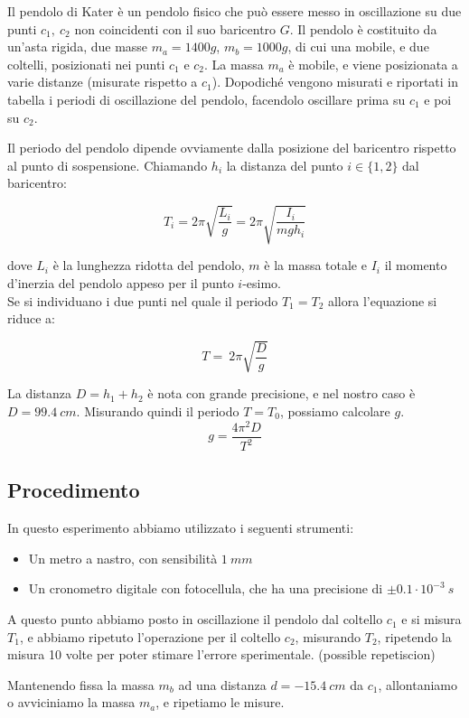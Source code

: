 Il pendolo di Kater è un pendolo fisico che può essere messo in oscillazione su due punti $c_1,\ c_2$ non coincidenti con il suo baricentro $G$. Il pendolo è costituito da un'asta rigida, due masse $m_a = 1400g$, $m_b=1000g$, di cui una mobile, e due coltelli, posizionati nei punti $c_1$ e $c_2$. La massa $m_a$ è mobile, e viene posizionata a varie distanze (misurate rispetto a $c_1$). Dopodiché vengono misurati e riportati in tabella i periodi di oscillazione del pendolo, facendolo oscillare prima su $c_1$ e poi su $c_2$.

Il periodo del pendolo dipende ovviamente dalla posizione del baricentro rispetto al punto di sospensione. Chiamando $h_i$ la distanza del punto $i\in\{1,2\}$ dal baricentro:

$$ T_i = 2 \pi \sqrt{\frac{L_i}{g}} = 2 \pi \sqrt{\frac{I_i}{m gh_i}}$$

dove $L_i$ è la lunghezza ridotta del pendolo, $m$ è la massa totale e $I_i$ il momento d'inerzia del pendolo appeso per il punto $i$-esimo.
\\
Se si individuano i due punti nel quale il periodo $T_1 = T_2$ allora l'equazione si riduce a:

$$ T = \ 2 \pi \sqrt{\frac{D}{g}}$$

La distanza $D= h_1 + h_2 $  è nota con grande precisione, e nel nostro caso è $D=99.4\ cm$. Misurando quindi il periodo $T=T_0$, possiamo calcolare $g$.
$$ g = \frac{4\pi^2D}{T^2}$$
\subsection{Procedimento}

In questo esperimento abbiamo utilizzato i seguenti strumenti:
\begin{itemize}
  \item Un metro a nastro, con sensibilità $1\ mm$
  \item Un cronometro digitale con fotocellula, che ha una precisione di $\pm 0.1 \cdot 10^{-3}\ s$
\end{itemize}

A questo punto abbiamo posto in oscillazione il pendolo dal coltello $c_1$ e si misura $T_1$, e abbiamo ripetuto l'operazione per il coltello $c_2$, misurando $T_2$, ripetendo la misura 10 volte per poter stimare l'errore sperimentale. (possible repetiscion)

Mantenendo fissa la massa $m_b$ ad una distanza $d = -15.4\ cm$ da $c_1$, allontaniamo o avviciniamo la massa $m_a$, e ripetiamo le misure.

